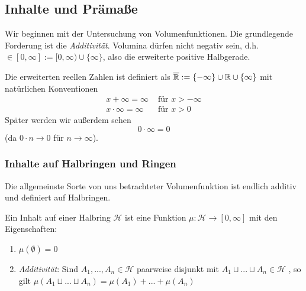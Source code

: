 \subsection{Inhalte und Prämaße}
Wir beginnen mit der Untersuchung von Volumenfunktionen. Die grundlegende Forderung ist die \emph{Additivität}. Volumina dürfen nicht negativ sein, d.h. $\in [0,\infty] := [0, \infty) \cup \{ \infty\}$, also die erweiterte positive Halbgerade. 
\begin{remark}
Die erweiterten reellen Zahlen ist definiert als $\overline{\mathbb{R}} := \{- \infty\} \cup \mathbb{R} \cup \{ \infty \}$ mit natürlichen Konventionen
\begin{align*}
	x + \infty = \infty & \text{ für } x > - \infty	\\
	x \cdot \infty = \infty &\text{ für } x> 0
\end{align*}
Später werden wir außerdem sehen 
\begin{equation*}
	0 \cdot \infty = 0
\end{equation*}
(da $ 0 \cdot n \longrightarrow 0$ für $n \longrightarrow \infty$).
\end{remark}
\subsubsection{Inhalte auf Halbringen und Ringen}
Die allgemeinste Sorte von uns betrachteter Volumenfunktion ist endlich additiv und definiert auf Halbringen.

\begin{definition}
\begin{mdframed}
Ein Inhalt auf einer Halbring $\mathcal{H}$ ist eine Funktion $\mu: \mathcal{H} \to [0,\infty]$ mit den Eigenschaften:
\begin{enumerate}[(\roman*),topsep=5pt, itemsep = 0 pt]
	\item $\mu (\emptyset) = 0$
	\item \emph{Additivität}: Sind $A_1,...,A_n \in \mathcal{H}$ paarweise disjunkt mit $A_1 \sqcup ... \sqcup A_n \in \mathcal{H}$ , so gilt $\mu(A_1 \sqcup ... \sqcup A_n) = \mu(A_1) + ... +\mu(A_n)$
\end{enumerate}
\end{mdframed}
\end{definition}

